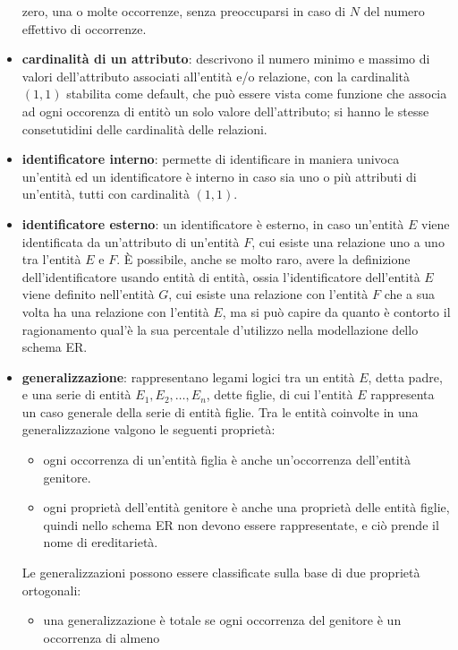 \documentclass[a4paper,12pt, oneside]{book}
\begin{document}
\begin{itemize}
	      zero, una o molte occorrenze, senza preoccuparsi in caso di $N$ del numero effettivo di occorrenze.
	\item \textbf{cardinalità di un attributo}: descrivono il numero minimo e massimo di valori dell'attributo
	      associati all'entità e/o relazione, con la cardinalità $(1, 1)$ stabilita come default,
	      che può essere vista come funzione che associa ad ogni occorenza di entitò un solo valore dell'attributo;
	      si hanno le stesse consetutidini delle cardinalità delle relazioni.
	\item \textbf{identificatore interno}: permette di identificare in maniera univoca un'entità ed un identificatore è interno
	      in caso sia uno o più attributi di un'entità, tutti con cardinalità $(1, 1)$.
	\item \textbf{identificatore esterno}: un identificatore è esterno, in caso un'entità $E$  viene identificata da un'attributo
	      di un'entità $F$, cui esiste una relazione uno a uno tra l'entità $E$ e $F$.\newline
	      È possibile, anche se molto raro, avere la definizione dell'identificatore usando entità di entità, ossia
	      l'identificatore dell'entità $E$ viene definito nell'entità $G$, cui esiste una relazione con l'entità $F$
	      che a sua volta ha una relazione con l'entità $E$, ma si può capire da quanto è contorto il ragionamento
	      qual'è la sua percentale d'utilizzo nella modellazione dello schema ER.
	\item \textbf{generalizzazione}: rappresentano legami logici tra un entità $E$, detta padre, e una serie di entità $E_1, E_2, \dots, E_n$,
	      dette figlie, di cui l'entità $E$ rappresenta un caso generale della serie di entità figlie.\newline
	      Tra le entità coinvolte in una generalizzazione valgono le seguenti proprietà:
	      \begin{itemize}
		      \item ogni occorrenza di un'entità figlia è anche un'occorrenza dell'entità genitore.
		      \item ogni proprietà dell'entità genitore è anche una proprietà delle entità figlie, quindi
		            nello schema ER non devono essere rappresentate, e ciò prende il nome di ereditarietà.
	      \end{itemize}
	      Le generalizzazioni possono essere classificate sulla base di due proprietà ortogonali:
	      \begin{itemize}
		      \item una generalizzazione è totale se ogni occorrenza del genitore è un occorrenza di almeno

\end{itemize}
\end{itemize}
\end{document}
